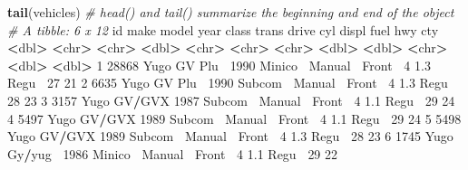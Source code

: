 \documentclass[
]{book}
\newenvironment{Shaded}{\begin{snugshade}}{\end{snugshade}}
\newcommand{\CommentTok}[1]{\textcolor[rgb]{0.56,0.35,0.01}{\textit{#1}}}
\newcommand{\DecValTok}[1]{\textcolor[rgb]{0.00,0.00,0.81}{#1}}
\newcommand{\ErrorTok}[1]{\textcolor[rgb]{0.64,0.00,0.00}{\textbf{#1}}}
\newcommand{\FloatTok}[1]{\textcolor[rgb]{0.00,0.00,0.81}{#1}}
\newcommand{\KeywordTok}[1]{\textcolor[rgb]{0.13,0.29,0.53}{\textbf{#1}}}
\newcommand{\NormalTok}[1]{#1}
\newcommand{\OperatorTok}[1]{\textcolor[rgb]{0.81,0.36,0.00}{\textbf{#1}}}
\newcommand{\StringTok}[1]{\textcolor[rgb]{0.31,0.60,0.02}{#1}}
\begin{document}
\begin{Shaded}
\begin{Highlighting}[]
\KeywordTok{tail}\NormalTok{(vehicles) }\CommentTok{# head() and tail() summarize the beginning and end of the object}
\CommentTok{# A tibble: 6 x 12}
\NormalTok{     id make  model    year class   trans   drive    cyl displ fuel    hwy   cty}
  \OperatorTok{<}\NormalTok{dbl}\OperatorTok{>}\StringTok{ }\ErrorTok{<}\NormalTok{chr}\OperatorTok{>}\StringTok{ }\ErrorTok{<}\NormalTok{chr}\OperatorTok{>}\StringTok{   }\ErrorTok{<}\NormalTok{dbl}\OperatorTok{>}\StringTok{ }\ErrorTok{<}\NormalTok{chr}\OperatorTok{>}\StringTok{   }\ErrorTok{<}\NormalTok{chr}\OperatorTok{>}\StringTok{   }\ErrorTok{<}\NormalTok{chr}\OperatorTok{>}\StringTok{  }\ErrorTok{<}\NormalTok{dbl}\OperatorTok{>}\StringTok{ }\ErrorTok{<}\NormalTok{dbl}\OperatorTok{>}\StringTok{ }\ErrorTok{<}\NormalTok{chr}\OperatorTok{>}\StringTok{ }\ErrorTok{<}\NormalTok{dbl}\OperatorTok{>}\StringTok{ }\ErrorTok{<}\NormalTok{dbl}\OperatorTok{>}
\DecValTok{1} \DecValTok{28868}\NormalTok{ Yugo  GV Plu}\OperatorTok{~}\StringTok{  }\DecValTok{1990}\NormalTok{ Minico}\OperatorTok{~}\StringTok{ }\NormalTok{Manual}\OperatorTok{~}\StringTok{ }\NormalTok{Front}\OperatorTok{~}\StringTok{     }\DecValTok{4}   \FloatTok{1.3}\NormalTok{ Regu}\OperatorTok{~}\StringTok{    }\DecValTok{27}    \DecValTok{21}
\DecValTok{2}  \DecValTok{6635}\NormalTok{ Yugo  GV Plu}\OperatorTok{~}\StringTok{  }\DecValTok{1990}\NormalTok{ Subcom}\OperatorTok{~}\StringTok{ }\NormalTok{Manual}\OperatorTok{~}\StringTok{ }\NormalTok{Front}\OperatorTok{~}\StringTok{     }\DecValTok{4}   \FloatTok{1.3}\NormalTok{ Regu}\OperatorTok{~}\StringTok{    }\DecValTok{28}    \DecValTok{23}
\DecValTok{3}  \DecValTok{3157}\NormalTok{ Yugo  GV}\OperatorTok{/}\NormalTok{GVX   }\DecValTok{1987}\NormalTok{ Subcom}\OperatorTok{~}\StringTok{ }\NormalTok{Manual}\OperatorTok{~}\StringTok{ }\NormalTok{Front}\OperatorTok{~}\StringTok{     }\DecValTok{4}   \FloatTok{1.1}\NormalTok{ Regu}\OperatorTok{~}\StringTok{    }\DecValTok{29}    \DecValTok{24}
\DecValTok{4}  \DecValTok{5497}\NormalTok{ Yugo  GV}\OperatorTok{/}\NormalTok{GVX   }\DecValTok{1989}\NormalTok{ Subcom}\OperatorTok{~}\StringTok{ }\NormalTok{Manual}\OperatorTok{~}\StringTok{ }\NormalTok{Front}\OperatorTok{~}\StringTok{     }\DecValTok{4}   \FloatTok{1.1}\NormalTok{ Regu}\OperatorTok{~}\StringTok{    }\DecValTok{29}    \DecValTok{24}
\DecValTok{5}  \DecValTok{5498}\NormalTok{ Yugo  GV}\OperatorTok{/}\NormalTok{GVX   }\DecValTok{1989}\NormalTok{ Subcom}\OperatorTok{~}\StringTok{ }\NormalTok{Manual}\OperatorTok{~}\StringTok{ }\NormalTok{Front}\OperatorTok{~}\StringTok{     }\DecValTok{4}   \FloatTok{1.3}\NormalTok{ Regu}\OperatorTok{~}\StringTok{    }\DecValTok{28}    \DecValTok{23}
\DecValTok{6}  \DecValTok{1745}\NormalTok{ Yugo  Gy}\OperatorTok{/}\NormalTok{yug}\OperatorTok{~}\StringTok{  }\DecValTok{1986}\NormalTok{ Minico}\OperatorTok{~}\StringTok{ }\NormalTok{Manual}\OperatorTok{~}\StringTok{ }\NormalTok{Front}\OperatorTok{~}\StringTok{     }\DecValTok{4}   \FloatTok{1.1}\NormalTok{ Regu}\OperatorTok{~}\StringTok{    }\DecValTok{29}    \DecValTok{22}


\end{Highlighting}
\end{Shaded}
\end{document}
